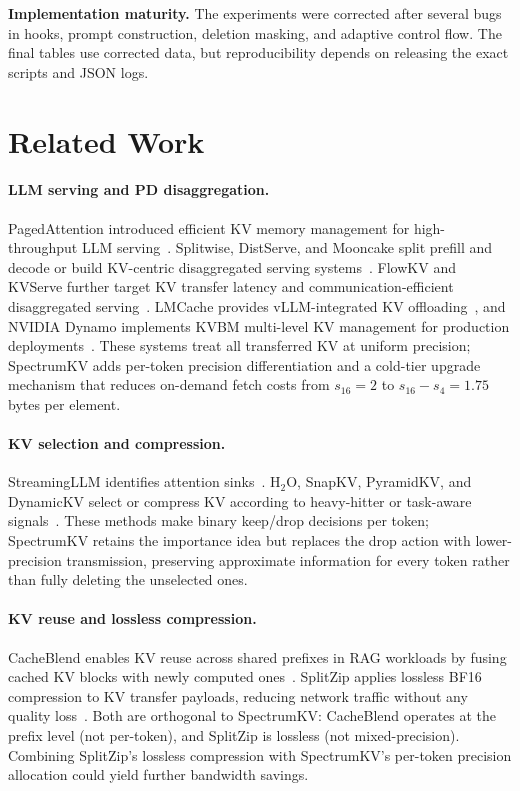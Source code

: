 \documentclass[11pt]{article}
\newcommand{\method}{SpectrumKV}
\theoremstyle{plain}
\theoremstyle{definition}
\begin{document}
\textbf{Implementation maturity.}  The experiments were corrected after several bugs in hooks, prompt construction, deletion masking, and adaptive control flow.  The final tables use corrected data, but reproducibility depends on releasing the exact scripts and JSON logs.

\section{Related Work}
\label{sec:related}

\paragraph{LLM serving and PD disaggregation.}
PagedAttention introduced efficient KV memory management for high-throughput LLM serving~\citep{pagedattention}.  Splitwise, DistServe, and Mooncake split prefill and decode or build KV-centric disaggregated serving systems~\citep{splitwise,distserve,mooncake}.  FlowKV and KVServe further target KV transfer latency and communication-efficient disaggregated serving~\citep{flowkv,kvserve}.  LMCache provides vLLM-integrated KV offloading~\citep{lmcache}, and NVIDIA Dynamo implements KVBM multi-level KV management for production deployments~\citep{nvidiadynamo}.  These systems treat all transferred KV at uniform precision; \method{} adds per-token precision differentiation and a cold-tier upgrade mechanism that reduces on-demand fetch costs from $s_{16}=2$ to $s_{16}-s_4=1.75$ bytes per element.

\paragraph{KV selection and compression.}
StreamingLLM identifies attention sinks~\citep{streamingllm}.  H$_2$O, SnapKV, PyramidKV, and DynamicKV select or compress KV according to heavy-hitter or task-aware signals~\citep{h2o,snapkv,pyramidkv,dynamickv}.  These methods make binary keep/drop decisions per token; \method{} retains the importance idea but replaces the drop action with lower-precision transmission, preserving approximate information for every token rather than fully deleting the unselected ones.

\paragraph{KV reuse and lossless compression.}
CacheBlend enables KV reuse across shared prefixes in RAG workloads by fusing cached KV blocks with newly computed ones~\citep{cacheblend}.  SplitZip applies lossless BF16 compression to KV transfer payloads, reducing network traffic without any quality loss~\citep{splitzip}.  Both are orthogonal to \method{}: CacheBlend operates at the prefix level (not per-token), and SplitZip is lossless (not mixed-precision).  Combining SplitZip's lossless compression with \method{}'s per-token precision allocation could yield further bandwidth savings.
\end{document}
